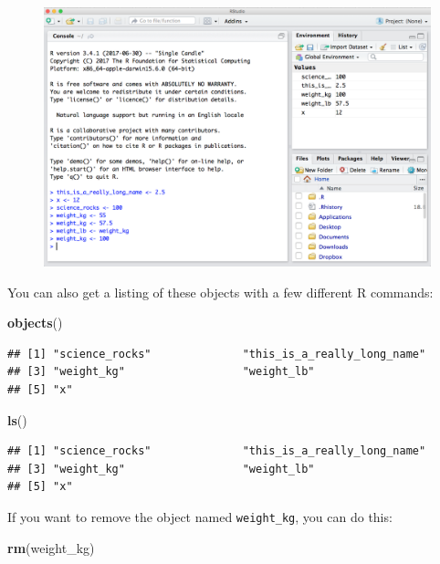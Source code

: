 \documentclass[]{book}
\newenvironment{Shaded}{\begin{snugshade}}{\end{snugshade}}
\newcommand{\KeywordTok}[1]{\textcolor[rgb]{0.13,0.29,0.53}{\textbf{{#1}}}}
\newcommand{\NormalTok}[1]{{#1}}
\theoremstyle{definition}
\theoremstyle{definition}
\theoremstyle{definition}
\theoremstyle{remark}
\begin{document}
\begin{figure}[htbp]
\centering
\includegraphics{img/RStudio_IDE_env.png}
\caption{}
\end{figure}

You can also get a listing of these objects with a few different R
commands:

\begin{Shaded}
\begin{Highlighting}[]
\KeywordTok{objects}\NormalTok{()}
\end{Highlighting}
\end{Shaded}

\begin{verbatim}
## [1] "science_rocks"              "this_is_a_really_long_name"
## [3] "weight_kg"                  "weight_lb"                 
## [5] "x"
\end{verbatim}

\begin{Shaded}
\begin{Highlighting}[]
\KeywordTok{ls}\NormalTok{()}
\end{Highlighting}
\end{Shaded}

\begin{verbatim}
## [1] "science_rocks"              "this_is_a_really_long_name"
## [3] "weight_kg"                  "weight_lb"                 
## [5] "x"
\end{verbatim}

If you want to remove the object named \texttt{weight\_kg}, you can do
this:

\begin{Shaded}
\begin{Highlighting}[]
\KeywordTok{rm}\NormalTok{(weight_kg)}
\end{Highlighting}
\end{Shaded}
\end{document}
